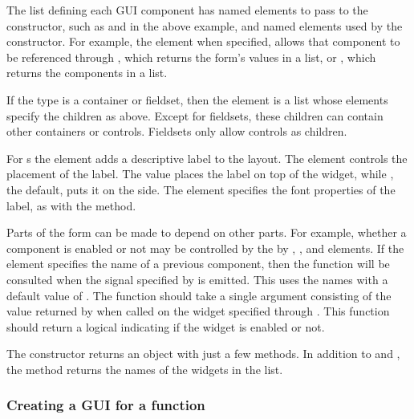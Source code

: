 The list defining each GUI component has named elements to pass to the
constructor, such as  and  in the above
example, and named elements used by the 
constructor. For example, 
the  element when specified, allows that
component to be referenced through ,
which returns the form's values in a list, or \method{[}{gformlayout},
which returns the components in a list.

If the type is a container or fieldset, then the 
element is a list whose elements specify the children as
above. Except for fieldsets, these children can contain other
containers or controls. Fieldsets only allow controls as children.


For s the  element adds a descriptive label
to the layout. The  element controls the placement of
the label. The value  places the label on top of the
widget, while , the default, puts it on the side. The
 element specifies the font properties of the label,
as with the  method.

Parts of the form can be made to depend on other parts. For example, 
whether a component is enabled or not may be controlled by the by ,
, and  elements. If the
 element specifies the name of a previous component,
then the function  will be consulted when the signal
specified by  is emitted. This uses the
 names with a default value of
. The  function should take a single
argument consisting of the value returned by  when called
on the widget specified through . This function
should return a logical indicating if the widget is enabled or not.

The constructor returns an object with just a few methods. In addition to
 and \meth{[}, the  method
returns the names of the widgets in the list.


\subsubsection{Creating a GUI for a function}
\label{sec:gWidgets-autom-creat-gui}

